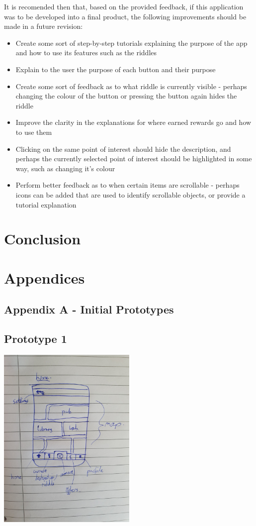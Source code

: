 \documentclass[10pt,twocolumn]{article} %
\begin{document}
It is recomended then that, based on the provided feedback, if this application was to be developed into a final product, the following improvements should be made in a future revision:
\begin{itemize}[noitemsep]
 \item Create some sort of step-by-step tutorials explaining the purpose of the app and how to use its features such as the riddles
 \item Explain to the user the purpose of each button and their purpose
 \item Create some sort of feedback as to what riddle is currently visible - perhaps changing the colour of the button or pressing the button again hides the riddle
 \item Improve the clarity in the explanations for where earned rewards go and how to use them
 \item Clicking on the same point of interest should hide the description, and perhaps the currently selected point of interest should be highlighted in some way, such as changing it's colour
 \item Perform better feedback as to when certain items are scrollable - perhaps icons can be added that are used to identify scrollable objects, or provide a tutorial explanation
\end{itemize}
\section*{Conclusion}

\onecolumn
\section*{Appendices}
\subsection*{Appendix A - Initial Prototypes}
\subsection*{Prototype 1}
\includegraphics[width=0.5\textwidth]{./figures/bens_initial_proto/1.jpg}
\end{document}
